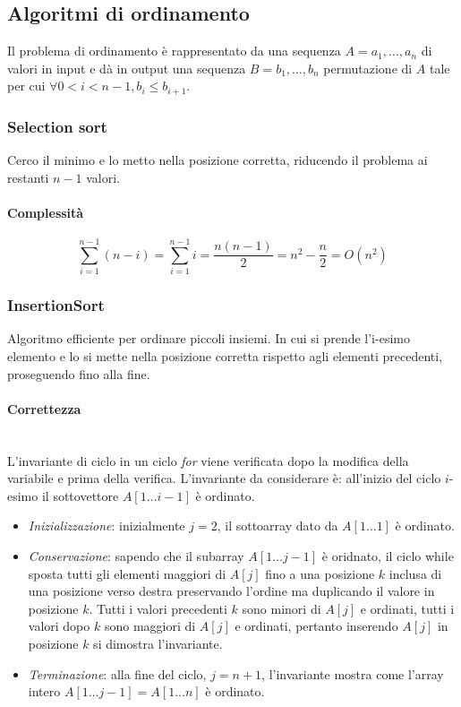 \subsection{Algoritmi di ordinamento}
Il problema di ordinamento \`e rappresentato da una sequenza $A=a_1, \dots, a_n$ di valori in input e d\`a in output una sequenza $B=b_1, \dots, b_n$ 
permutazione di $A$ tale per cui $\forall 0<i<n-1, b_i\le b_{i+1}$.
\subsubsection{Selection sort}
Cerco il minimo e lo metto nella posizione corretta, riducendo il problema ai restanti $n-1$ valori.



\paragraph{Complessit\`a}
\begin{equation*}
\sum\limits_{i=1}^{n-1}(n-i)=\sum\limits_{i=1}^{n-1}i=\dfrac{n(n-1)}{2}=n^2-\dfrac{n}{2}=O(n^2)
\end{equation*}
\subsubsection{InsertionSort}
Algoritmo efficiente per ordinare piccoli insiemi. In cui si prende l'i-esimo elemento e lo si mette nella posizione corretta rispetto agli elementi
precedenti, proseguendo fino alla fine.

\paragraph{Correttezza}\mbox{}\\
L'invariante di ciclo in un ciclo \emph{for} viene verificata dopo la modifica della variabile e prima della verifica. L'invariante da considerare \`e: all'inizio del ciclo $i$-esimo
il sottovettore $A[1\dots i -1]$ \`e ordinato.
\begin{itemize}
	\item \emph{Inizializzazione}: inizialmente $j=2$, il sottoarray dato da $A[1\dots 1]$ \`e ordinato.
	\item \emph{Conservazione}: sapendo che il subarray $A[1\dots j-1]$ \`e oridnato, il ciclo while sposta tutti gli elementi maggiori di $A[j]$ fino a una posizione $k$ inclusa
		di una posizione verso destra preservando l'ordine ma duplicando il valore in posizione $k$. Tutti i valori precedenti $k$ sono minori di $A[j]$ e ordinati, tutti i 
		valori dopo $k$ sono maggiori di $A[j]$ e ordinati, pertanto inserendo $A[j]$ in posizione $k$ si dimostra l'invariante. 
	\item \emph{Terminazione}: alla fine del ciclo, $j = n + 1$, l'invariante mostra come l'array intero $A[1\dots j - 1] = A[1\dots n]$ \`e ordinato.
\end{itemize}
